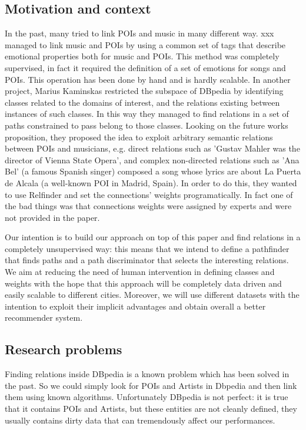 \subsection{Motivation and context}
In the past, many tried to link POIs and music in many different way. xxx managed to link music and POIs by using a common set of tags that describe emotional properties both for music and POIs.
This method was completely supervised, in fact it required the definition of a set of emotions for songs and POIs. This operation has been done by hand and is hardly scalable.
In another project, Marius Kaminskas restricted the subspace of DBpedia by identifying classes related to the domains of interest, and the relations existing between instances of such classes. In this way they managed to find relations in a set of paths constrained to pass belong to those classes. Looking on the future works proposition, they proposed the idea to exploit arbitrary semantic relations between POIs and musicians, e.g. direct relations such as 'Gustav Mahler was the director of Vienna State Opera', and complex non-directed relations such as 'Ana Bel' (a famous Spanish singer) composed a song whose lyrics are about La Puerta de Alcala (a well-known POI in Madrid, Spain). 
In order to do this, they wanted to use Relfinder and set the connections' weights programatically. In fact one of the bad things was that connections weights were assigned by experts and were not provided in the paper.

Our intention is to build our approach on top of this paper and find relations in a completely unsupervised way: this means that we intend to define a pathfinder that finds paths and a path discriminator that selects the interesting relations. We aim at reducing the need of human intervention in defining classes and weights with the hope that this approach will be completely data driven and easily scalable to different cities. Moreover, we will use different datasets with the intention to exploit their implicit advantages and obtain overall a better recommender system.

\subsection{Research problems}
Finding relations inside DBpedia is a known problem which has been solved in the past. So we could simply look for POIs and Artists in Dbpedia and then link them using known algorithms.
Unfortunately DBpedia is not perfect: it is true that it contains POIs and Artists, but these entities are not cleanly defined, they usually contains dirty data that can tremendously affect our performances.

